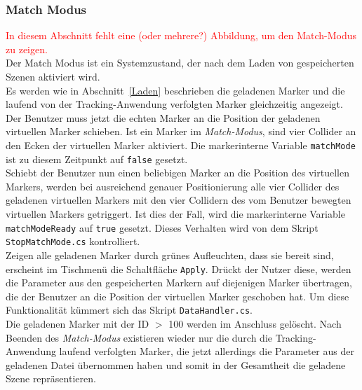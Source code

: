 \subsubsection{Match Modus}\label{MatchModus}
\textcolor{red}{In diesem Abschnitt fehlt eine (oder mehrere?) Abbildung, um den Match-Modus zu zeigen.}\\
Der Match Modus ist ein Systemzustand, der nach dem Laden von gespeicherten Szenen aktiviert wird.\\
Es werden wie in Abschnitt~\ref{Laden} beschrieben die geladenen Marker und die laufend von der Tracking-Anwendung verfolgten Marker gleichzeitig angezeigt. Der Benutzer muss jetzt die echten Marker an die Position der geladenen virtuellen Marker schieben. Ist ein Marker im \emph{Match-Modus}, sind vier Collider an den Ecken der virtuellen Marker aktiviert. Die markerinterne Variable \texttt{matchMode} ist zu diesem Zeitpunkt auf \texttt{false} gesetzt.\\
Schiebt der Benutzer nun einen beliebigen Marker an die Position des virtuellen Markers, werden bei ausreichend genauer Positionierung alle vier Collider des geladenen virtuellen Markers mit den vier Collidern des vom Benutzer bewegten virtuellen Markers getriggert. Ist dies der Fall, wird die markerinterne Variable \texttt{matchModeReady} auf \texttt{true} gesetzt. Dieses Verhalten wird von dem Skript \texttt{StopMatchMode.cs} kontrolliert.\\
Zeigen alle geladenen Marker durch grünes Aufleuchten, dass sie bereit sind, erscheint im Tischmenü die Schaltfläche \texttt{Apply}. Drückt der Nutzer diese, werden die Parameter aus den gespeicherten Markern auf diejenigen Marker übertragen, die der Benutzer an die Position der virtuellen Marker geschoben hat. Um diese Funktionalität kümmert sich das Skript \texttt{DataHandler.cs}.\\
Die geladenen Marker mit der ID $>$ 100 werden im Anschluss gelöscht. Nach Beenden des \emph{Match-Modus} existieren wieder nur die durch die Tracking-Anwendung laufend verfolgten Marker, die jetzt allerdings die Parameter aus der geladenen Datei übernommen haben und somit in der Gesamtheit die geladene Szene repräsentieren.


